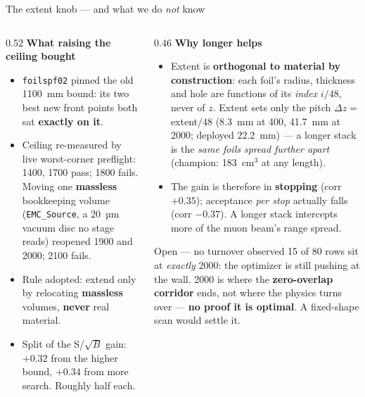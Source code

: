 \documentclass[aspectratio=169,10pt]{beamer}
\begin{document}
\begin{frame}{The extent knob --- and what we do \emph{not} know}
\begin{columns}[T]
\begin{column}{0.52\textwidth}
\small\textbf{What raising the ceiling bought}
\begin{itemize}\small
  \item \texttt{foilspf02} pinned the old 1100~mm bound: its two best new front
        points both sat \textbf{exactly on it}.
  \item Ceiling re-measured by live worst-corner preflight:
        1400, 1700 pass; 1800 fails. Moving one \textbf{massless} bookkeeping
        volume (\texttt{EMC\_Source}, a 20~µm vacuum disc no stage reads)
        reopened 1900 and 2000; 2100 fails.
  \item Rule adopted: extend only by relocating \textbf{massless} volumes,
        \textbf{never} real material.
  \item Split of the S/$\sqrt{B}$ gain: $+0.32$ from the higher bound,
        $+0.34$ from more search. Roughly half each.
\end{itemize}
\end{column}
\begin{column}{0.46\textwidth}
\small\textbf{Why longer helps}
\begin{itemize}\small
  \item Extent is \textbf{orthogonal to material by construction}: each foil's
        radius, thickness and hole are functions of its \emph{index} $i/48$, never
        of $z$. Extent sets only the pitch $\Delta z={}$extent$/48$ (8.3~mm at 400,
        41.7~mm at 2000; deployed 22.2~mm) --- a longer stack is the \emph{same
        foils spread further apart} (champion: 183~cm$^3$ at any length).
  \item The gain is therefore in \textbf{stopping} (corr $+0.35$); acceptance
        \emph{per stop} actually falls (corr $-0.37$). A longer stack intercepts
        more of the muon beam's range spread.
\end{itemize}
\vspace{0.3em}
\begin{alertblock}{\small Open --- no turnover observed}
\scriptsize
15 of 80 rows sit at \emph{exactly} 2000: the optimizer is still pushing at the
wall. 2000 is where the \textbf{zero-overlap corridor} ends, not where the physics
turns over --- \textbf{no proof it is optimal}. A fixed-shape scan would settle it.
\end{alertblock}
\end{column}
\end{columns}
\end{frame}
\end{document}
